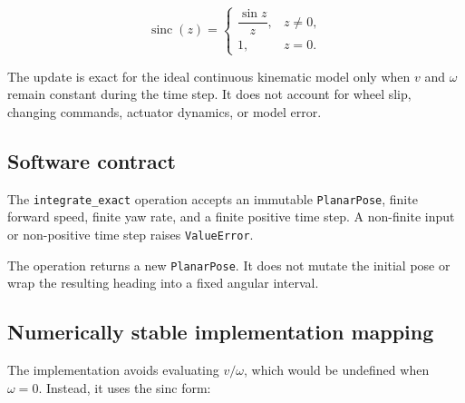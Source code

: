 \documentclass[
  australian,
  12pt,
  letterpaper,
  DIV=11,
  numbers=noendperiod,
  twoside]{scrreprt}
\begin{document}
\[
\operatorname{sinc}(z)
=
\begin{cases}
\dfrac{\sin z}{z}, & z\neq0,\\[4pt]
1, & z=0.
\end{cases}
\]

The update is exact for the ideal continuous kinematic model only when
\(v\) and \(\omega\) remain constant during the time step. It does not
account for wheel slip, changing commands, actuator dynamics, or model
error.

\subsection{Software contract}\label{software-contract-2}

The \texttt{integrate\_exact} operation accepts an immutable
\texttt{PlanarPose}, finite forward speed, finite yaw rate, and a finite
positive time step. A non-finite input or non-positive time step raises
\texttt{ValueError}.

The operation returns a new \texttt{PlanarPose}. It does not mutate the
initial pose or wrap the resulting heading into a fixed angular
interval.

\subsection{Numerically stable implementation
mapping}\label{numerically-stable-implementation-mapping}

The implementation avoids evaluating \(v/\omega\), which would be
undefined when \(\omega=0\). Instead, it uses the sinc form:
\end{document}
